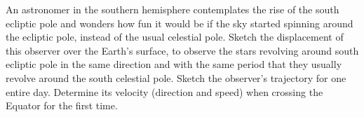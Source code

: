 An astronomer in the southern hemisphere contemplates the rise of the south
ecliptic pole and wonders how fun it would be if the sky started spinning
around the ecliptic pole, instead of the usual celestial pole. Sketch the
displacement of this observer over the Earth's surface, to observe the stars
revolving around south ecliptic pole in the same direction and with the same
period that they usually revolve around the south celestial pole. Sketch the
observer's trajectory for one entire day. Determine its velocity (direction
and speed) when crossing the Equator for the first time.
